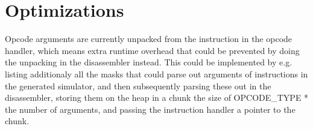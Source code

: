 \section{Optimizations}
Opcode arguments are currently unpacked from the instruction in the opcode
handler, which means extra runtime overhead that could be prevented by doing
the unpacking in the disassembler instead. This could be implemented by e.g.
listing additionaly all the masks that could parse out arguments of
instructions in the generated simulator, and then subsequently parsing these
out in the disassembler, storing them on the heap in a chunk the size of 
OPCODE\_TYPE * the number of arguments, and passing the instruction handler a 
pointer to the chunk.
